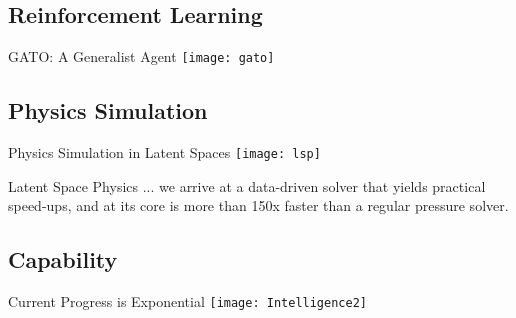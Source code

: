 \subsection{Reinforcement Learning}
\begin{frame}[c]{GATO: A Generalist Agent}
    \texttt{[image: gato]} \\
\end{frame}

\subsection{Physics Simulation}
\begin{frame}[c]{Physics Simulation in Latent Spaces}
    \texttt{[image: lsp]} \\
    \large
    \begin{aquote}{Latent Space Physics \cite{wiewel_latent_2019}}
        ... we arrive at a data-driven solver that yields practical speed-ups, and
        at its core is more than 150x faster than a regular pressure solver.
    \end{aquote}
\end{frame}

\subsection{Capability}

\begin{frame}[c]{Current Progress is Exponential}
    \texttt{[image: Intelligence2]} \\
\end{frame}


